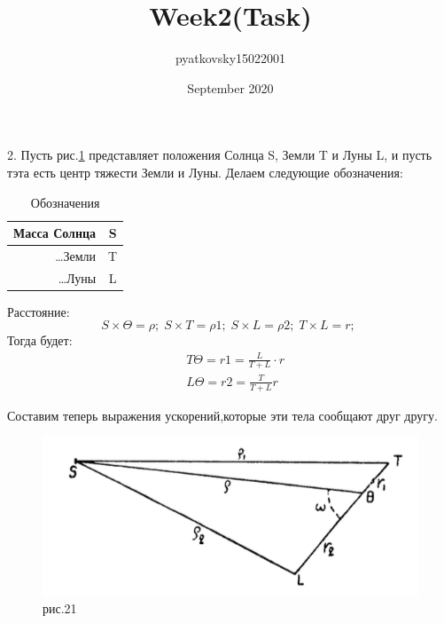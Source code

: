 \documentclass[a4paper,12pt]{article}
\title{Week2(Task)}
\author{pyatkovsky15022001 }
\date{September 2020}
\begin{document}
\maketitle

\section{}

2. Пусть рис.\ref{tab:main_mean} представляет положения Солнца S, Земли T
и Луны L, и пусть тэта есть центр тяжести Земли и Луны. Делаем следующие обозначения:

\begin{table}[!h]
    \begin{center}
        \caption{Обозначения}\label{tab:main_mean} 
        \begin{tabular}{|r|c|}
            \hline Масса Солнца & S \\ \hline
            \dots Земли & T\\ \hline
            \dots Луны & L\\ \hline
        \end{tabular}
    \end{center}
\end{table}


Расстояние:
\begin{equation*}
    S \times \Theta = \rho;\;
    S \times T = \rho1;\;
    S \times L = \rho2;\;
    T \times L = r;\;
\end{equation*}
Тогда будет:
\begin{equation}
    \begin{aligned}
        &T \Theta = r1 = \frac{L}{T +L} \cdot r\\
        &L \Theta = r2 = \frac{T}{T +L} r
    \end{aligned}
\end{equation}

Составим теперь выражения ускорений,которые эти тела сообщают друг другу.

\begin{figure}[bhtp]
    \centering
    \includegraphics{21.png}
    \caption{рис.21}
    \label{fig:21}
\end{figure}
\end{document}
